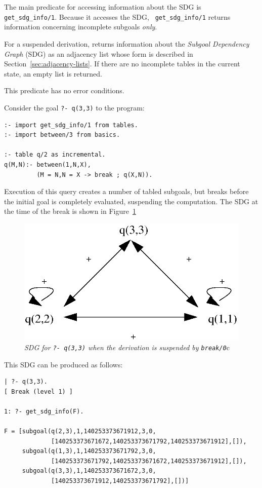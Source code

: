 The main predicate for accessing information about the SDG is {\tt
  get\_sdg\_info/1}.  Because it accesses the SDG, {\tt
  get\_sdg\_info/1} returns information concerning incomplete subgoals
{\em only}.

\begin{description}
%
For a suspended derivation, returns information about the {\em
  Subgoal Dependency Graph} (SDG) as an adjacency list whose form is
described in Section~\ref{sec:adjacency-lists}.
%
If there are no incomplete tables in the current state, an empty list
is returned.

This predicate has no error conditions.

\begin{example} \rm \label{ex:get-sdg}
Consider the goal {\tt ?- q(3,3)} to the program:

\begin{verbatim}
:- import get_sdg_info/1 from tables.
:- import between/3 from basics.

:- table q/2 as incremental.
q(M,N):- between(1,N,X),
         (M = N,N = X -> break ; q(X,N)).
\end{verbatim}
Execution of this query creates a number of tabled subgoals, but
breaks before the initial goal is completely evaluated, suspending the
computation.  The SDG at the time of the break is shown in
Figure~\ref{fig:sdg-break-1}

\begin{figure}[htbp]
\centering
\includegraphics[width=.4\textwidth]{sdg-q-2}
\caption{{\em SDG for {\tt ?- q(3,3)} when the derivation is suspended by
  {\tt break/0}}c} \label{fig:sdg-break-1}
\end{figure}
%
This SDG can be produced as follows:
\begin{small}
\begin{verbatim}
| ?- q(3,3).
[ Break (level 1) ]

1: ?- get_sdg_info(F).

F = [subgoal(q(2,3),1,140253373671912,3,0,
             [140253373671672,140253373671792,140253373671912],[]),
     subgoal(q(1,3),1,140253373671792,3,0,
             [140253373671792,140253373671672,140253373671912],[]),
     subgoal(q(3,3),1,140253373671672,3,0,
             [140253373671912,140253373671792],[])]
\end{verbatim}
\end{small}


\end{example}
\end{description}
